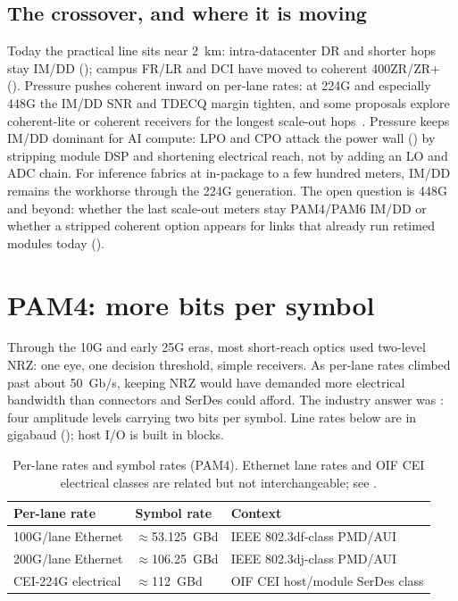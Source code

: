 \subsection{The crossover, and where it is moving}

Today the practical line sits near 2~km: intra-datacenter DR and shorter hops stay
IM/DD (); campus FR/LR and DCI have moved to coherent
400ZR/ZR+ (). Pressure pushes coherent inward on per-lane rates: at
224G and especially 448G the IM/DD SNR and TDECQ margin tighten, and some proposals
explore coherent-lite or coherent receivers for the longest scale-out
hops~\cite{cei448,e4ai448}. Pressure keeps IM/DD dominant for AI compute: LPO and
CPO attack the power wall () by stripping module
DSP and shortening electrical reach, not by adding an LO and ADC chain. For
inference fabrics at in-package to a few hundred meters, IM/DD remains the workhorse
through the 224G generation. The open question is 448G and beyond: whether the
last scale-out meters stay PAM4/PAM6 IM/DD or whether a stripped coherent option
appears for links that already run retimed modules today ().

\section{PAM4: more bits per symbol}

Through the 10G and early 25G eras, most short-reach optics used two-level NRZ:
one eye, one decision threshold, simple receivers. As per-lane rates climbed past
about 50~Gb/s, keeping NRZ would have demanded more electrical bandwidth than
connectors and SerDes could afford. The industry answer was : four
amplitude levels carrying two bits per symbol. Line rates below are in gigabaud
(); host I/O is built in 
blocks.

\begin{table}[ht]
\centering
\caption{Per-lane rates and symbol rates (PAM4). Ethernet lane rates and OIF CEI
electrical classes are related but not interchangeable; see
.\label{tab:pam4-rates}}
\renewcommand{\arraystretch}{1.25}%
\begin{tabular}{@{}lll@{}}
\toprule
Per-lane rate & Symbol rate & Context \\
\midrule
100G/lane Ethernet & $\approx$53.125~GBd & IEEE 802.3df-class PMD/AUI \\
\addlinespace[1.5em]
200G/lane Ethernet & $\approx$106.25~GBd & IEEE 802.3dj-class PMD/AUI \\
\addlinespace[1.5em]
CEI-224G electrical & $\approx$112~GBd & OIF CEI host/module SerDes class \\
\bottomrule
\end{tabular}
\end{table}


